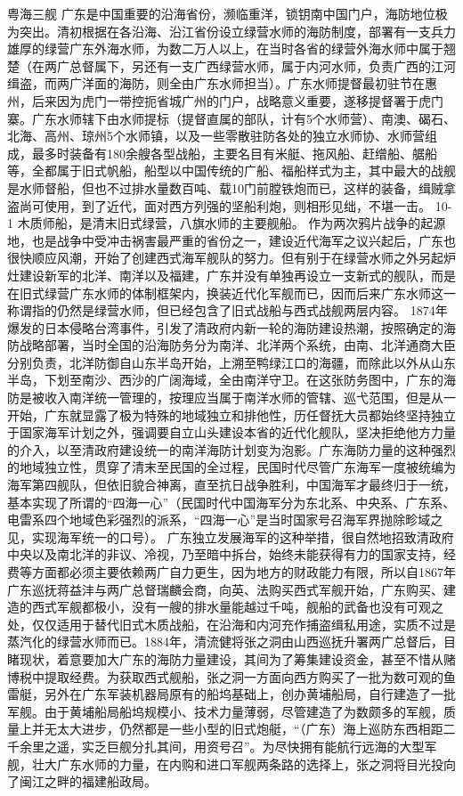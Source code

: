 \documentclass[12pt,UTF8]{ctexbook}
\begin{document}
粤海三舰
广东是中国重要的沿海省份，濒临重洋，锁钥南中国门户，海防地位极为突出。清初根据在各沿海、沿江省份设立绿营水师的海防制度，部署有一支兵力雄厚的绿营广东外海水师，为数二万人以上，在当时各省的绿营外海水师中属于翘楚（在两广总督属下，另还有一支广西绿营水师，属于内河水师，负责广西的江河缉盗，而两广洋面的海防，则全由广东水师担当）。广东水师提督最初驻节在惠州，后来因为虎门一带控扼省城广州的门户，战略意义重要，遂移提督署于虎门寨。广东水师辖下由水师提标（提督直属的部队，计有5个水师营）、南澳、碣石、北海、高州、琼州5个水师镇，以及一些零散驻防各处的独立水师协、水师营组成，最多时装备有180余艘各型战船，主要名目有米艇、拖风船、赶缯船、艍船等，全都属于旧式帆船，船型以中国传统的广船、福船样式为主，其中最大的战舰是水师督船，但也不过排水量数百吨、载10门前膛铁炮而已，这样的装备，缉贼拿盗尚可使用，到了近代，面对西方列强的坚船利炮，则相形见绌，不堪一击。
10-1 木质师船，是清末旧式绿营，八旗水师的主要舰船。
作为两次鸦片战争的起源地，也是战争中受冲击祸害最严重的省份之一，建设近代海军之议兴起后，广东也很快顺应风潮，开始了创建西式海军舰队的努力。但有别于在绿营水师之外另起炉灶建设新军的北洋、南洋以及福建，广东并没有单独再设立一支新式的舰队，而是在旧式绿营广东水师的体制框架内，换装近代化军舰而已，因而后来广东水师这一称谓指的仍然是绿营水师，但已经包含了旧式战船与西式战舰两层内容。
1874年爆发的日本侵略台湾事件，引发了清政府内新一轮的海防建设热潮，按照确定的海防战略部署，当时全国的沿海防务分为南洋、北洋两个系统，由南、北洋通商大臣分别负责，北洋防御自山东半岛开始，上溯至鸭绿江口的海疆，而除此以外从山东半岛，下划至南沙、西沙的广阔海域，全由南洋守卫。在这张防务图中，广东的海防是被收入南洋统一管理的，按理应当属于南洋水师的管辖、巡弋范围，但是从一开始，广东就显露了极为特殊的地域独立和排他性，历任督抚大员都始终坚持独立于国家海军计划之外，强调要自立山头建设本省的近代化舰队，坚决拒绝他方力量的介入，以至清政府建设统一的南洋海防计划变为泡影。广东海防力量的这种强烈的地域独立性，贯穿了清末至民国的全过程，民国时代尽管广东海军一度被统编为海军第四舰队，但依旧貌合神离，直至抗日战争胜利，中国海军才最终归于一统，基本实现了所谓的“四海一心”（民国时代中国海军分为东北系、中央系、广东系、电雷系四个地域色彩强烈的派系，“四海一心”是当时国家号召海军界抛除畛域之见，实现海军统一的口号）。
广东独立发展海军的这种举措，很自然地招致清政府中央以及南北洋的非议、冷视，乃至暗中拆台，始终未能获得有力的国家支持，经费等方面都必须主要依赖两广自力更生，因为地方的财政能力有限，所以自1867年广东巡抚蒋益沣与两广总督瑞麟会商，向英、法购买西式军舰开始，广东购买、建造的西式军舰都极小，没有一艘的排水量能越过千吨，舰船的武备也没有可观之处，仅仅适用于替代旧式木质战船，在沿海和内河充作捕盗缉私用途，实质不过是蒸汽化的绿营水师而已。1884年，清流健将张之洞由山西巡抚升署两广总督后，目睹现状，着意要加大广东的海防力量建设，其间为了筹集建设资金，甚至不惜从赌博税中提取经费。为获取西式舰船，张之洞一方面向西方购买了一批为数可观的鱼雷艇，另外在广东军装机器局原有的船坞基础上，创办黄埔船局，自行建造了一批军舰。由于黄埔船局船坞规模小、技术力量薄弱，尽管建造了为数颇多的军舰，质量上并无太大进步，仍然都是一些小型的旧式炮艇，“（广东）海上巡防东西相距二千余里之遥，实乏巨舰分扎其间，用资号召”。为尽快拥有能航行远海的大型军舰，壮大广东水师的力量，在内购和进口军舰两条路的选择上，张之洞将目光投向了闽江之畔的福建船政局。
\end{document}
